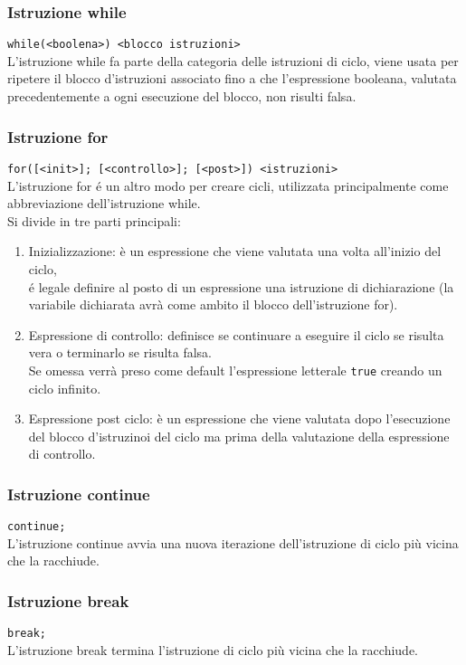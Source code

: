 \subsubsection{Istruzione while}
\lstinline|while(<boolena>) <blocco istruzioni>| \\
L'istruzione while fa parte della categoria delle istruzioni di ciclo, viene usata per ripetere
il blocco d'istruzioni associato fino a che l'espressione booleana, valutata precedentemente a ogni 
esecuzione del blocco, non risulti falsa.

\subsubsection{Istruzione for}
\lstinline{for([<init>]; [<controllo>]; [<post>]) <istruzioni>} \\
L'istruzione for é un altro modo per creare cicli, utilizzata principalmente come abbreviazione
dell'istruzione while. \\
Si divide in tre parti principali:
\begin{enumerate}
    \item {
        Inizializzazione: è un espressione che viene valutata una volta all'inizio del ciclo, \\
        é legale definire al posto di un espressione una istruzione di dichiarazione
        (la variabile dichiarata avrà come ambito il blocco dell'istruzione for).
    }
    \item { 
        Espressione di controllo: definisce se continuare a eseguire il ciclo se risulta vera 
        o terminarlo se risulta falsa. \\
        Se omessa verrà preso come default l'espressione letterale \lstinline|true| creando un ciclo infinito.
    }
    \item {
        Espressione post ciclo: è un espressione che viene valutata dopo l'esecuzione del blocco d'istruzinoi 
        del ciclo ma prima della valutazione della espressione di controllo.
    }
\end{enumerate}

\subsubsection{Istruzione continue}
\lstinline|continue;| \\
L'istruzione continue avvia una nuova iterazione dell'istruzione di ciclo più vicina che la racchiude.

\subsubsection{Istruzione break}
\lstinline|break;| \\
L'istruzione break termina l'istruzione di ciclo più vicina che la racchiude.

